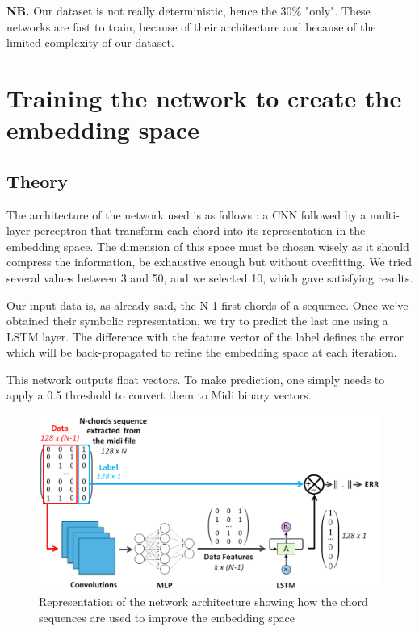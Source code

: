 \documentclass{article}
\begin{document}
\textbf{NB.} Our dataset is not really deterministic, hence the 30\% "only". These networks are fast to train, because of their architecture and because of the limited complexity of our dataset.

\section{Training the network to create the embedding space}

\subsection{Theory}

\hspace{0.5cm} 
The architecture of the network used is as follows : a CNN followed by a multi-layer perceptron that transform each chord into its representation in  the embedding space. The dimension of this space must be chosen wisely as it should compress the information, be exhaustive enough but without overfitting. We tried several values between 3 and 50, and we selected 10, which gave satisfying results.

\hspace{0.5cm} Our input data is, as already said, the N-1 first chords of a sequence. Once we've obtained their symbolic representation, we try to predict the last one using a LSTM layer.
The difference with the feature vector of the label defines the error which will be back-propagated to refine the embedding space at each iteration.

\hspace{0.5cm} This network outputs float vectors. To make prediction, one simply needs to apply a 0.5 threshold to convert them to Midi binary vectors.

\begin{figure}[H]
\centering
\includegraphics[width =1\textwidth]{Sch_ma_principe_2.png}
\caption{Representation of the network architecture showing how the chord sequences are used to improve the embedding space}
\label{schema}
\end{figure}
\end{document}
